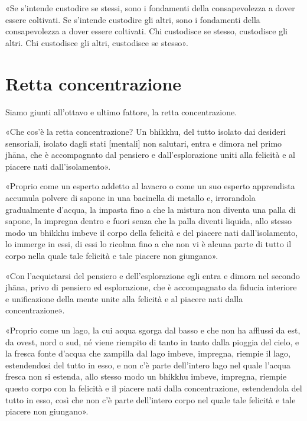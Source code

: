 
«Se s’intende custodire se stessi, sono i fondamenti della consapevolezza a
dover essere coltivati. Se s’intende custodire gli altri, sono i fondamenti
della consapevolezza a dover essere coltivati. Chi custodisce se stesso,
custodisce gli altri. Chi custodisce gli altri, custodisce se stesso».


\section*{Retta concentrazione}

 Siamo giunti all’ottavo e ultimo fattore, la retta
concentrazione.

 «Che cos’è la retta concentrazione? Un bhikkhu, del tutto
isolato dai desideri sensoriali, isolato dagli stati [mentali] non salutari,
entra e dimora nel primo jhāna, che è accompagnato dal pensiero e
dall’esplorazione uniti alla felicità e al piacere nati dall’isolamento».


«Proprio come un esperto addetto al lavacro o come un suo esperto apprendista
accumula polvere di sapone in una bacinella di metallo e, irrorandola
gradualmente d’acqua, la impasta fino a che la mistura non diventa una palla di
sapone, la impregna dentro e fuori senza che la palla diventi liquida, allo
stesso modo un bhikkhu imbeve il corpo della felicità e del piacere nati
dall’isolamento, lo immerge in essi, di essi lo ricolma fino a che non vi è
alcuna parte di tutto il corpo nella quale tale felicità e tale piacere non
giungano».


«Con l’acquietarsi del pensiero e dell’esplorazione egli entra e dimora nel
secondo jhāna, privo di pensiero ed esplorazione, che è accompagnato da fiducia
interiore e unificazione della mente unite alla felicità e al piacere nati dalla
concentrazione».


«Proprio come un lago, la cui acqua sgorga dal basso e che non ha afflussi da
est, da ovest, nord o sud, né viene riempito di tanto in tanto dalla pioggia del
cielo, e la fresca fonte d’acqua che zampilla dal lago imbeve, impregna, riempie
il lago, estendendosi del tutto in esso, e non c’è parte dell’intero lago nel
quale l’acqua fresca non si estenda, allo stesso modo un bhikkhu imbeve,
impregna, riempie questo corpo con la felicità e il piacere nati dalla
concentrazione, estendendola del tutto in esso, così che non c’è parte
dell’intero corpo nel quale tale felicità e tale piacere non giungano».

